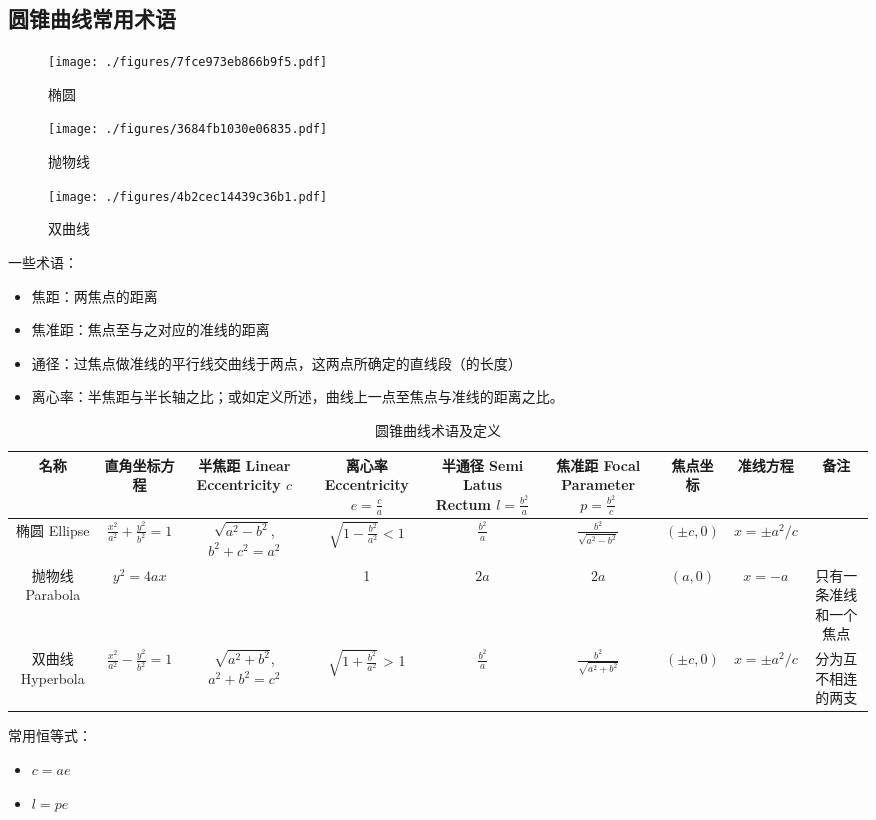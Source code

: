 \subsection{圆锥曲线常用术语}

\begin{figure}[ht]
\centering
\texttt{[image: ./figures/7fce973eb866b9f5.pdf]}
\caption{椭圆} \label{fig_conic_2}
\end{figure}

\begin{figure}[ht]
\centering
\texttt{[image: ./figures/3684fb1030e06835.pdf]}
\caption{抛物线} \label{fig_conic_3}
\end{figure}

\begin{figure}[ht]
\centering
\texttt{[image: ./figures/4b2cec14439c36b1.pdf]}
\caption{双曲线} \label{fig_conic_4}
\end{figure}

一些术语：
\begin{itemize}
\item 焦距：两焦点的距离
\item 焦准距：焦点至与之对应的准线的距离
\item 通径：过焦点做准线的平行线交曲线于两点，这两点所确定的直线段（的长度）
\item 离心率：半焦距与半长轴之比；或如定义所述，曲线上一点至焦点与准线的距离之比。
\end{itemize}

\begin{table}[ht]
\centering
\caption{圆锥曲线术语及定义}\label{tab_conic_1}
\begin{tabular}{|c|c|c|c|c|c|c|c|c|}
\hline
名称 & 直角坐标方程 & 半焦距 Linear Eccentricity $c$ & 离心率 Eccentricity $e = \frac{c}{a}$ & 半通径 Semi Latus Rectum $l=\frac{b^2}{a}$ & 焦准距 Focal Parameter$p=\frac{b^2}{c}$ & 焦点坐标&准线方程 &备注\\
\hline
椭圆 Ellipse & $\frac{x^2}{a^2} + \frac{y^2}{b^2} = 1$ & $\sqrt{a^2-b^2}$, $b^2+c^2=a^2$ & $\sqrt{1-\frac{b^2}{a^2}} < 1$ & $\frac{b^2}{a}$ & $\frac{b^2}{\sqrt{a^2-b^2}}$ & $(\pm c,0)$ & $x=\pm a^2/c$& \\
\hline
抛物线 Parabola & $y^2=4ax$ & \ & 1 & $2a$ & $2a$ & $(a,0)$ & $x=-a$ & 只有一条准线和一个焦点\\
\hline
双曲线 Hyperbola & $\frac{x^2}{a^2} - \frac{y^2}{b^2} = 1$ & $\sqrt{a^2+b^2}$,$a^2+b^2=c^2$ & $\sqrt{1+\frac{b^2}{a^2}}$ > 1 & $\frac{b^2}{a}$ & $\frac{b^2}{\sqrt{a^2+b^2}}$ & $(\pm c,0)$ & $x=\pm a^2/c$ & 分为互不相连的两支 \\
\hline
\end{tabular}
\end{table}

常用恒等式：
\begin{itemize}
\item $c=ae$
\item $l=pe$
\end{itemize}
